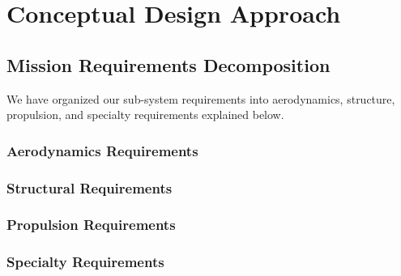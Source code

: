 \documentclass[proposal]{byu-aero}
\begin{document}

\section{Conceptual Design Approach} %
\label{sec:ConceptualDesign}



\subsection{Mission Requirements Decomposition}
\label{ssec:MissionReqs}

We have organized our sub-system requirements into aerodynamics, structure, propulsion, and specialty requirements explained below.

\subsubsection{Aerodynamics Requirements}
\label{sssec:AerodynamicReqs}

\subsubsection{Structural Requirements}
\label{sssec:StructuralReqs}


\subsubsection{Propulsion Requirements}
\label{sssec:PropulsionReqs}

\subsubsection{Specialty Requirements} %
\label{sssec:SpecialReqs}
\end{document}
